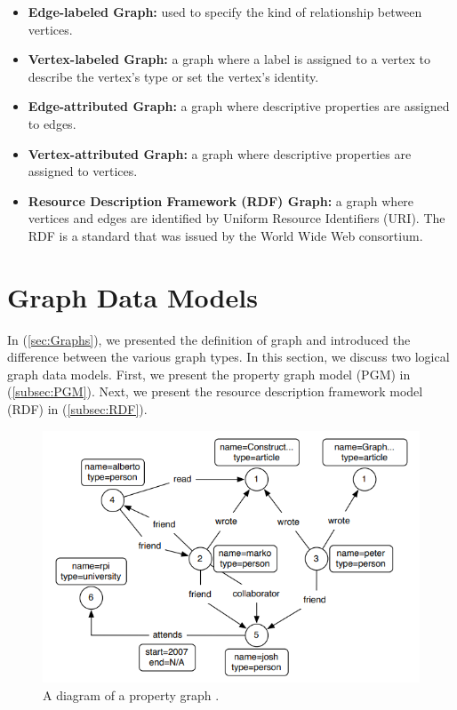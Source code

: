{\begin{itemize}
\item \textbf{Edge-labeled Graph:} used to specify the kind of relationship between vertices.

\item \textbf{Vertex-labeled Graph:} a graph where a label is assigned to a vertex to describe the vertex's type or set the vertex's identity.

\item \textbf{Edge-attributed Graph:} a graph where descriptive properties are assigned to edges.

\item \textbf{Vertex-attributed Graph:} a graph where descriptive properties are assigned to vertices.

\item \textbf{Resource Description Framework (RDF) Graph:} a graph where vertices and edges are identified by Uniform Resource Identifiers (URI). The RDF is a standard that was issued by the World Wide Web consortium.

\end{itemize}


\section{Graph Data Models}
\label{sec:GraphModels}

In (\ref{sec:Graphs}), we presented the definition of graph and introduced the difference between the various graph types. In this section, we discuss two logical graph data models. First, we present the property graph model (PGM) in (\ref{subsec:PGM}). Next, we present the resource description framework model (RDF) in (\ref{subsec:RDF}).


\begin{figure}[H]
\centering
\includegraphics[width=17cm]{pics/PGM.png}
\caption{A diagram of a property graph \cite{DBLP:journals/corr/abs-1006-2361}.}
\label{fig_PGM}
\end{figure} 

}

